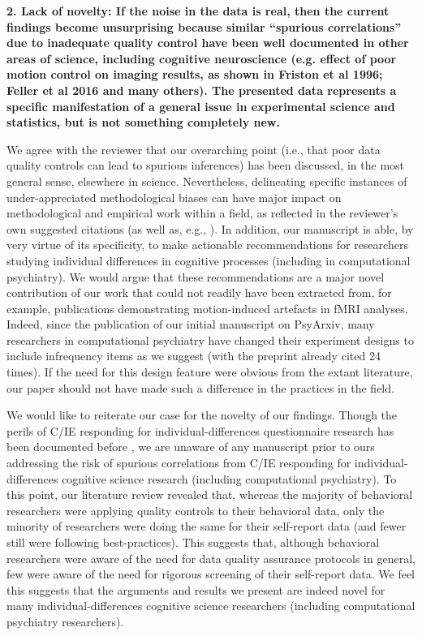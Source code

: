 \documentclass[a4paper,notitlepage,12pt]{article}
\begin{document}
\textbf{2. Lack of novelty: If the noise in the data is real, then the current findings become unsurprising because similar ``spurious correlations'' due to inadequate quality control have been well documented in other areas of science, including cognitive neuroscience (e.g. effect of poor motion control on imaging results, as shown in Friston et al 1996; Feller et al 2016 and many others). The presented data represents a specific manifestation of a general issue in experimental science and statistics, but is not something completely new.}

We agree with the reviewer that our overarching point (i.e., that poor data quality controls can lead to spurious inferences) has been discussed, in the most general sense, elsewhere in science. Nevertheless, delineating specific instances of under-appreciated methodological biases can have major impact on methodological and empirical work within a field, as reflected in the reviewer's own suggested citations (as well as, e.g., \cite{eklund2016cluster, bradley2021unrepresentative}). In addition, our manuscript is able, by very virtue of its specificity, to make actionable recommendations for researchers studying individual differences in cognitive processes (including in computational psychiatry). We would argue that these recommendations are a major novel contribution of our work that could not readily have been extracted from, for example, publications demonstrating motion-induced artefacts in fMRI analyses. Indeed, since the publication of our initial manuscript on PsyArxiv, many researchers in computational psychiatry have changed their experiment designs to include infrequency items as we suggest (with the preprint already cited 24 times). If the need for this design feature were obvious from the extant literature, our paper should not have made such a difference in the practices in the field.

We would like to reiterate our case for the novelty of our findings. Though the perils of C/IE responding for individual-differences questionnaire research has been documented before \cite{chandler2020participant, arias2020little}, we are unaware of any manuscript prior to ours addressing the risk of spurious correlations from C/IE responding for individual-differences cognitive science research (including computational psychiatry). To this point, our literature review revealed that, whereas the majority of behavioral researchers were applying quality controls to their behavioral data, only the minority of researchers were doing the same for their self-report data (and fewer still were following best-practices). This suggests that, although behavioral researchers were aware of the need for data quality assurance protocols in general, few were aware of the need for rigorous screening of their self-report data. We feel this suggests that the arguments and results we present are indeed novel for many individual-differences cognitive science researchers (including computational psychiatry researchers).
\end{document}
